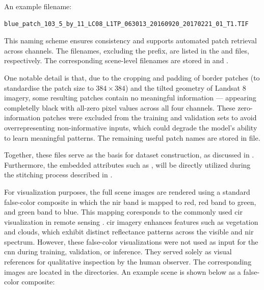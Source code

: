 {An example filename:

\begin{lstlisting}
blue_patch_103_5_by_11_LC08_L1TP_063013_20160920_20170221_01_T1.TIF
\end{lstlisting}

This naming scheme ensures consistency and supports automated patch retrieval across channels.
The filenames, excluding the  prefix, are listed in the  and  files, respectively.
The corresponding scene-level filenames are stored in  and .

One notable detail is that, due to the cropping and padding of border patches (to standardise the patch size to \ensuremath{384\times384}) and the tilted geometry of Landsat 8 imagery,
some resulting patches contain no meaningful information --- appearing completelly black with all-zero pixel values across all four channels.
These zero-information patches were excluded from the training and validation sets to avoid overrepresenting non-informative inputs,
which could degrade the model's ability to learn meaningful patterns.
The remaining useful patch names are stored in  file.

Together, these  files serve as the basis for dataset construction, as discussed in .
Furthermore, the embedded attributes such as ,  will be directly utilized during the stitching process described in .

For visualization purposes, the full scene images are rendered using a standard false-color composite in which the \gls{nir} band is mapped to red, red band to green, and green band to blue.
This mapping coresponds to the commonly used \gls{cir} visualization in remote sensing \cite{cir1}.
\gls{cir} imagery enhances features such as vegetation and clouds, which exhibit distinct reflectance patterns across the visible and \gls{nir} spectrum.
However, these false-color visualizations were not used as input for the \gls{cnn} during training, validation, or inference.
They served solely as visual references for qualitative inspection by the human observer.
The corresponding images are located in the  directories.
An example scene is shown below as a false-color composite: 

}
